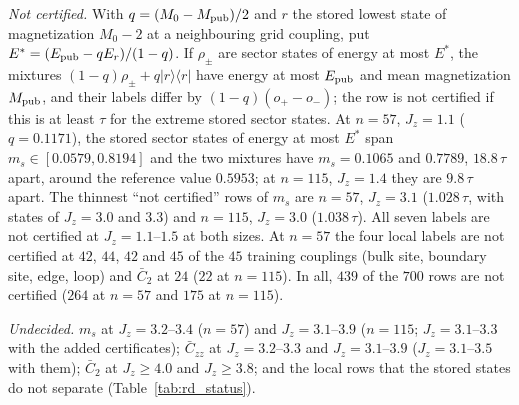 \documentclass[aps,prx,onecolumn,10pt,nofootinbib,longbibliography,floatfix]{revtex4-2}
\theoremstyle{remark}
\newcommand{\Jz}{J_z}
\newcommand{\ms}{m_s}
\newcommand{\Czz}{\bar C_{zz}}
\newcommand{\Ctwo}{\bar C_{2}}
\begin{document}
\emph{Not certified.} With $q=(M_0-M_{\rm pub})/2$ and $r$ the stored lowest state of magnetization $M_0-2$ at a
neighbouring grid coupling, put $E^*=(E_{\rm pub}-qE_r)/(1-q)$. If $\rho_\pm$ are sector states of energy at most
$E^*$, the mixtures $(1-q)\rho_\pm+q|r\rangle\langle r|$ have energy at most $E_{\rm pub}$ and mean magnetization
$M_{\rm pub}$, and their labels differ by $(1-q)(o_+-o_-)$; the row is not certified if this is at least $\tau$ for
the extreme stored sector states. At $n=57$, $\Jz=1.1$ ($q=0.1171$), the stored sector states of energy at most %
$E^*$ span $\ms\in[0.0579,0.8194]$ and the two mixtures have $\ms=0.1065$ and $0.7789$, $18.8\,\tau$ apart, around %
the reference value $0.5953$; at $n=115$, $\Jz=1.4$ they are $9.8\,\tau$ apart. The thinnest ``not certified'' rows %
of $\ms$ are $n=57$, $\Jz=3.1$ ($1.028\,\tau$, with states of $\Jz=3.0$ and $3.3$) and $n=115$, $\Jz=3.0$ ($1.038\,\tau$). %
All seven labels are not certified at $\Jz=1.1$--$1.5$ at both sizes. At $n=57$ the four local labels are not %
certified at $42$, $44$, $42$ and $45$ of the $45$ training couplings (bulk site, boundary site, edge, loop) and %
$\Ctwo$ at $24$ ($22$ at $n=115$). In all, $439$ of the $700$ rows are not certified ($264$ at $n=57$ and $175$ at %
$n=115$).

\emph{Undecided.} $\ms$ at $\Jz=3.2$--$3.4$ ($n=57$) and $\Jz=3.1$--$3.9$ ($n=115$; $\Jz=3.1$--$3.3$ with the added %
certificates); $\Czz$ at $\Jz=3.2$--$3.3$ and $\Jz=3.1$--$3.9$ ($\Jz=3.1$--$3.5$ with them); $\Ctwo$ at $\Jz\ge4.0$ and %
$\Jz\ge3.8$; and the local rows that the stored states do not separate (Table~\ref{tab:rd_status}).
\end{document}
